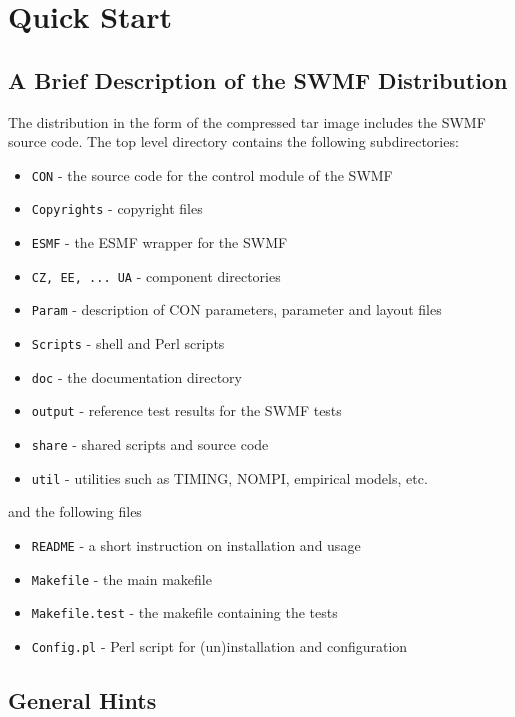 \chapter{Quick Start}

\section{A Brief Description of the SWMF Distribution}

The distribution in the form of the compressed tar image
includes the SWMF source code.
The top level directory contains the following subdirectories:
\begin{itemize}\itemsep=0pt
\item {\tt CON}     - the source code for the control module of the SWMF
\item {\tt Copyrights} - copyright files
\item {\tt ESMF}    - the ESMF wrapper for the SWMF
\item {\tt CZ, EE, ... UA} - component directories
\item {\tt Param}   - description of CON parameters, parameter and layout files
\item {\tt Scripts} - shell and Perl scripts
\item {\tt doc}     - the documentation directory %
\item {\tt output}  - reference test results for the SWMF tests
\item {\tt share}   - shared scripts and source code
\item {\tt util}    - utilities such as TIMING, NOMPI, empirical models, etc.
\end{itemize}
and the following files
\begin{itemize}\itemsep=0pt
\item {\tt README}        - a short instruction on installation and usage
\item {\tt Makefile}      - the main makefile
\item {\tt Makefile.test} - the makefile containing the tests %
\item {\tt Config.pl}     - Perl script for (un)installation and configuration
\end{itemize}

\section{General Hints}

